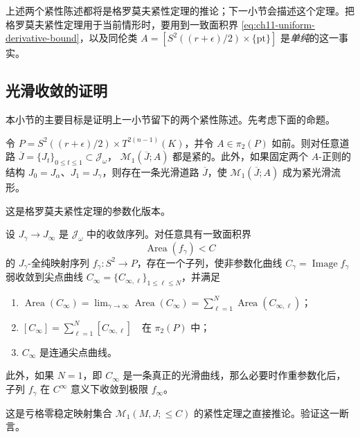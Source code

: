 上述两个紧性陈述都将是格罗莫夫紧性定理的推论；下一小节会描述这个定理。把格罗莫夫紧性定理用于当前情形时，要用到一致面积界
\eqref{eq:ch11-uniform-derivative-bound}，以及同伦类
$A=[S^2((r+\epsilon)/2)\times\{\mathrm{pt}\}]$ 是\emph{单纯}的这一事实。

\subsection{光滑收敛的证明}
\label{subsec:proof-smooth-convergence}

本小节的主要目标是证明上一小节留下的两个紧性陈述。先考虑下面的命题。

\begin{proposition}\label{prop:ch11-parameterized-moduli-compact}
令
$P=S^2((r+\epsilon)/2)\times T^{2(n-1)}(K)$，并令
$A\in\pi_2(P)$ 如前。则对任意道路
$\overline J=\{J_t\}_{0\leq t\leq1}\subset\mathcal J_\omega$，
$\mathcal M_1(\overline J;A)$ 都是紧的。此外，如果固定两个 $A$-正则的结构
$J_0=J_\alpha$、$J_1=J_\gamma$，则存在一条光滑道路 $\overline J$，使
$\mathcal M_1(\overline J;A)$ 成为紧光滑流形。
\end{proposition}

这是格罗莫夫紧性定理的参数化版本。

\begin{theorem}[格罗莫夫收敛定理]\label{thm:ch11-gromov-convergence}
设 $J_\gamma\to J_\infty$ 是 $\mathcal J_\omega$ 中的收敛序列。对任意具有一致面积界
\[
 \operatorname{Area}(f_\gamma)<C
\]
的 $J_\gamma$-全纯映射序列 $f_\gamma:S^2\to P$，存在一个子列，使非参数化曲线
$C_\gamma=\operatorname{Image}f_\gamma$ 弱收敛到尖点曲线
$C_\infty=\{C_{\infty,\ell}\}_{1\leq\ell\leq N}$，并满足
\begin{enumerate}[label=(\arabic*)]
 \item $\displaystyle
 \operatorname{Area}(C_\infty)
 =\lim_{\gamma\to\infty}\operatorname{Area}(C_\infty)
 =\sum_{\ell=1}^N\operatorname{Area}(C_{\infty,\ell})$；
 \item $\displaystyle
 [C_\infty]=\sum_{\ell=1}^N[C_{\infty,\ell}]\quad\text{在 }\pi_2(P)\text{ 中}$；
 \item $C_\infty$ 是连通尖点曲线。
\end{enumerate}
此外，如果 $N=1$，即 $C_\infty$ 是一条真正的光滑曲线，那么必要时作重参数化后，子列 $f_\gamma$ 在 $C^\infty$ 意义下收敛到极限 $f_\infty$。
\end{theorem}

\begin{exercise}\label{ex:ch11-gromov-convergence-from-stable-maps}
这是亏格零稳定映射集合 $\mathcal M_1(M,J;\leq C)$ 的紧性定理之直接推论。验证这一断言。
\end{exercise}


